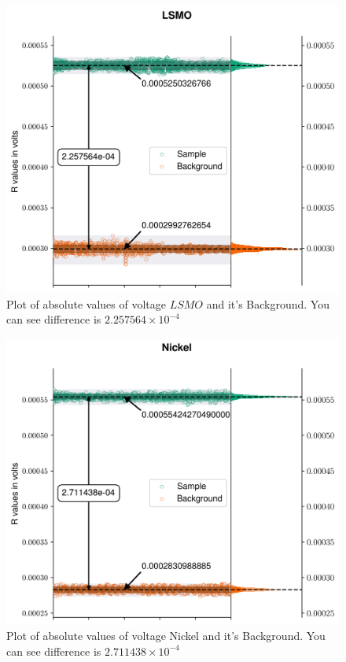 \begin{figure}[hbt!]
  \includegraphics[width= \linewidth]{plots/LSMOR.png}
  \caption{Plot of absolute values of voltage $LSMO$ and it's Background. You can see difference is $2.257564 \times 10^{-4}$}
  \label{fig:Rdata3}
\end{figure}
\begin{figure}[hbt!]
  \includegraphics[width= \linewidth]{plots/nickelR.png}
  \caption{Plot of absolute values of voltage Nickel and it's Background. You can see difference is $2.711438 \times 10^{-4}$}
  \label{fig:Rdata4}
\end{figure}

